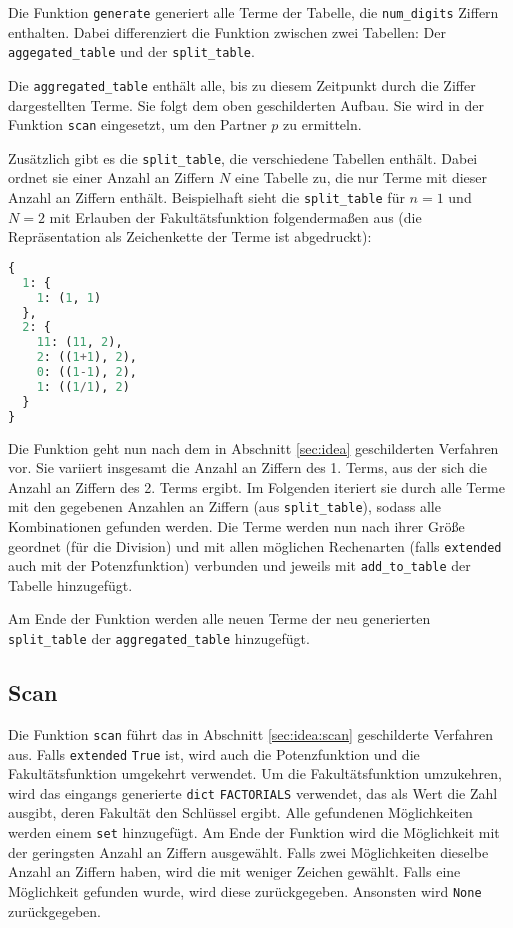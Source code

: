 \documentclass[a4paper,10pt,ngerman]{scrartcl}
\begin{document}
Die Funktion \texttt{generate} generiert alle Terme der Tabelle, die \texttt{num\_digits} Ziffern enthalten.
Dabei differenziert die Funktion zwischen zwei Tabellen: Der \texttt{aggegated\_table} und der \texttt{split\_table}.

Die \texttt{aggregated\_table} enthält alle, bis zu diesem Zeitpunkt durch die Ziffer dargestellten Terme.
Sie folgt dem oben geschilderten Aufbau.
Sie wird in der Funktion \texttt{scan} eingesetzt, um den Partner $p$ zu ermitteln.

Zusätzlich gibt es die \texttt{split\_table}, die verschiedene Tabellen enthält.
Dabei ordnet sie einer Anzahl an Ziffern $N$ eine Tabelle zu, die nur Terme mit dieser Anzahl an Ziffern enthält.
Beispielhaft sieht die \texttt{split\_table} für $n=1$ und $N=2$ mit Erlauben der Fakultätsfunktion folgendermaßen aus (die Repräsentation als Zeichenkette der Terme ist abgedruckt):
\begin{lstlisting}[language=Python]
{
  1: {
    1: (1, 1)
  }, 
  2: {
    11: (11, 2),
    2: ((1+1), 2),
    0: ((1-1), 2),
    1: ((1/1), 2)
  }
}
\end{lstlisting}

Die Funktion geht nun nach dem in Abschnitt \ref{sec:idea} geschilderten Verfahren vor.
Sie variiert insgesamt die Anzahl an Ziffern des 1. Terms, aus der sich die Anzahl an Ziffern des 2. Terms ergibt.
Im Folgenden iteriert sie durch alle Terme mit den gegebenen Anzahlen an Ziffern (aus \texttt{split\_table}), sodass alle Kombinationen gefunden werden.
Die Terme werden nun nach ihrer Größe geordnet (für die Division) und mit allen möglichen Rechenarten (falls \texttt{extended} auch mit der Potenzfunktion) verbunden und jeweils mit \texttt{add\_to\_table} der Tabelle hinzugefügt.

Am Ende der Funktion werden alle neuen Terme der neu generierten \texttt{split\_table} der \texttt{aggregated\_table} hinzugefügt.


\subsection{Scan}
\label{sec:implementation:scan}
Die Funktion \texttt{scan} führt das in Abschnitt \ref{sec:idea:scan} geschilderte Verfahren aus.
Falls \texttt{extended} \texttt{True} ist, wird auch die Potenzfunktion und die Fakultätsfunktion umgekehrt verwendet.
Um die Fakultätsfunktion umzukehren, wird das eingangs generierte \texttt{dict} \texttt{FACTORIALS} verwendet, das als Wert die Zahl ausgibt, deren Fakultät den Schlüssel ergibt.
Alle gefundenen Möglichkeiten werden einem \texttt{set} hinzugefügt.
Am Ende der Funktion wird die Möglichkeit mit der geringsten Anzahl an Ziffern ausgewählt.
Falls zwei Möglichkeiten dieselbe Anzahl an Ziffern haben, wird die mit weniger Zeichen gewählt.
Falls eine Möglichkeit gefunden wurde, wird diese zurückgegeben.
Ansonsten wird \texttt{None} zurückgegeben.
\end{document}
